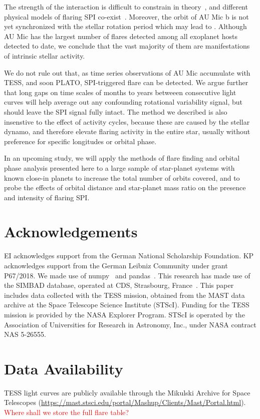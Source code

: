 \documentclass[fleqn,usenatbib,letters]{mnras}%
\begin{document}
The strength of the interaction is difficult to constrain in theory~\citep{strugarek2019}, and different physical models of flaring SPI co-exist~\citep{lanza2018close-by, saur2013}. Moreover, the orbit of AU Mic b is not yet synchronized with the stellar rotation period which may lead to . Although AU Mic has the largest number of flares detected among all exoplanet hosts detected to date, we conclude that the vast majority of them are manifestations of intrinsic stellar activity. 

We do not rule out that, as time series observations of AU Mic accumulate with TESS, and soon PLATO, SPI-triggered flare can be detected. We argue further that long gaps on time scales of months to years betweeen consecutive light curves will help average out any confounding rotational variability signal, but should leave the SPI signal fully intact. The method we described is also insenstive to the effect of activity cycles, because these are caused by the stellar dynamo, and therefore elevate flaring activity in the entire star, usually without preference for specific longitudes or orbital phase. 

In an upcoming study, we will apply the methods of flare finding and orbital phase analysis presented here to a large sample of star-planet systems with known close-in planets to increase the total number of orbits covered, and to probe the effects of orbital distance and star-planet mass ratio on the presence and intensity of flaring SPI.
\section*{Acknowledgements}
EI acknowledges support from the German National Scholarship Foundation. KP acknowledges support from the German Leibniz Community under grant P67/2018. We made use of numpy~\citep{numpy2020} and pandas~\citep{pandas2010,pandas2020software}. This research has made use of the SIMBAD database, operated at CDS, Strasbourg, France~\citep{wenger2000}. This paper includes data collected with the TESS mission, obtained from the MAST data archive at the Space Telescope Science Institute (STScI). Funding for the TESS mission is provided by the NASA Explorer Program. STScI is operated by the Association of Universities for Research in Astronomy, Inc., under NASA contract NAS 5-26555.

\section*{Data Availability}
TESS light curves are publicly available through the Mikulski Archive for Space Telescopes (\url{https://mast.stsci.edu/portal/Mashup/Clients/Mast/Portal.html}).
\textcolor{red}{Where shall we store the full flare table?}
\end{document}
